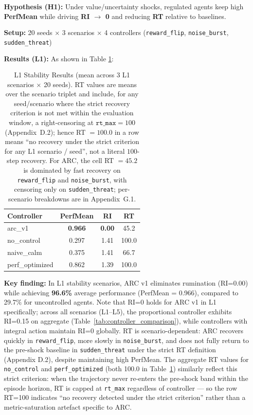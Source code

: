 \documentclass{article}
\begin{document}
\textbf{Hypothesis (H1):} Under value/uncertainty shocks, regulated agents keep high \textbf{PerfMean} while driving \textbf{RI $\to$ 0} and reducing \textbf{RT} relative to baselines.

\textbf{Setup:} 20 seeds $\times$ 3 scenarios $\times$ 4 controllers (\texttt{reward\_flip}, \texttt{noise\_burst}, \texttt{sudden\_threat})

\textbf{Results (L1):} As shown in Table \ref{tab:l1_results}:

\begin{table}[htbp]
\centering
\caption{L1 Stability Results (mean across 3 L1 scenarios $\times$ 20 seeds). RT values are means over the scenario triplet and include, for any seed/scenario where the strict recovery criterion is not met within the evaluation window, a right-censoring at $\texttt{rt\_max}=100$ (Appendix~D.2); hence RT $=100.0$ in a row means ``no recovery under the strict criterion for any L1 scenario / seed'', not a literal $100$-step recovery. For ARC, the cell RT $=45.2$ is dominated by fast recovery on \texttt{reward\_flip} and \texttt{noise\_burst}, with censoring only on \texttt{sudden\_threat}; per-scenario breakdowns are in Appendix~G.1.}
\label{tab:l1_results}
\begin{tabular}{@{}lccc@{}}
\toprule
Controller & PerfMean & RI & RT \\ \midrule
arc\_v1 & \textbf{0.966} & \textbf{0.00} & 45.2 \\
no\_control & 0.297 & 1.41 & 100.0 \\
naive\_calm & 0.375 & 1.41 & 66.7 \\
perf\_optimized & 0.862 & 1.39 & 100.0 \\ \bottomrule
\end{tabular}
\end{table}

\textbf{Key finding:} In L1 stability scenarios, ARC v1 eliminates rumination (RI=0.00) while achieving \textbf{96.6\%} average performance (PerfMean = 0.966), compared to 29.7\% for uncontrolled agents. Note that RI=0 holds for ARC v1 in L1 specifically; across all scenarios (L1--L5), the proportional controller exhibits RI=0.15 on aggregate (Table~\ref{tab:controller_comparison}), while controllers with integral action maintain RI=0 globally. RT is scenario-dependent: ARC recovers quickly in \texttt{reward\_flip}, more slowly in \texttt{noise\_burst}, and does not fully return to the pre-shock baseline in \texttt{sudden\_threat} under the strict RT definition (Appendix D.2), despite maintaining high PerfMean. The aggregate RT values for \texttt{no\_control} and \texttt{perf\_optimized} (both 100.0 in Table~\ref{tab:l1_results}) similarly reflect this strict criterion: when the trajectory never re-enters the pre-shock band within the episode horizon, RT is capped at \texttt{rt\_max} regardless of controller --- so the row RT=100 indicates ``no recovery detected under the strict criterion'' rather than a metric-saturation artefact specific to ARC.
\end{document}
